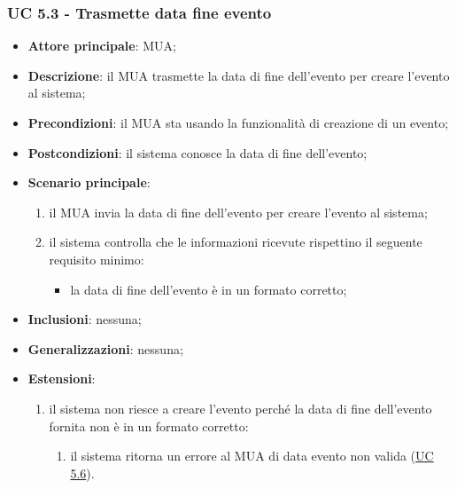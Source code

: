    \subsubsection{UC 5.3 - Trasmette data fine evento} \label{sec:UC5.3}
    \begin{itemize}
        \item \textbf{Attore principale}: MUA;
        \item \textbf{Descrizione}: il MUA trasmette la data di fine dell'evento per creare l'evento al sistema;
        \item \textbf{Precondizioni}: il MUA sta usando la funzionalità di creazione di un evento;
        \item \textbf{Postcondizioni}: il sistema conosce la data di fine dell'evento;
        \item \textbf{Scenario principale}:
            \begin{enumerate}
                \item il MUA invia la data di fine dell'evento per creare l'evento al sistema;
                \item il sistema controlla che le informazioni ricevute rispettino il seguente requisito minimo:
                    \begin{itemize}
                        \item la data di fine dell'evento è in un formato corretto;
                    \end{itemize}
            \end{enumerate}
        \item \textbf{Inclusioni}: nessuna;
        \item \textbf{Generalizzazioni}: nessuna;
        \item \textbf{Estensioni}:
            \begin{enumerate}[label=\alph*.]
                \item il sistema non riesce a creare l'evento perché la data di fine dell'evento fornita non è in un formato corretto:
                \begin{enumerate}[label=\arabic*.]
                    \item il sistema ritorna un errore al MUA di data evento non valida (\hyperref[sec:UC5.6]{UC 5.6}).
                \end{enumerate}
            \end{enumerate}
    \end{itemize}

